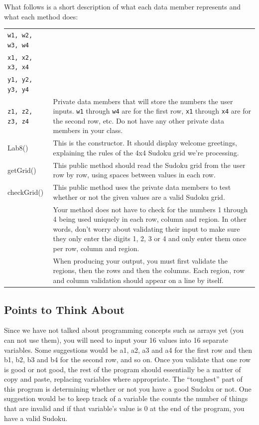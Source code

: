 \noindent What follows is a short description of what each data member represents and what each method does:\\
\begin{tabular}{|l|p{10cm}|}
\hline
{\tt w1, w2, w3, w4} &  \\
{\tt x1, x2, x3, x4} & \\
{\tt y1, y2, y3, y4} & \\
{\tt z1, z2, z3, z4}	&  Private data members that will store the numbers the user inputs.  {\tt w1} through {\tt w4} are for the first row, {\tt x1} through {\tt x4} are for the second row, etc.  Do not have any other private data members in your class.\\
\hline
Lab8()	&This is the constructor.  It should display welcome greetings, explaining the rules of the 4x4 Sudoku grid we're processing.\\
\hline
getGrid()	& This public method should read the Sudoku grid from the user row by row, using spaces between values in each row.\\
\hline 
checkGrid() &	This public method uses the private data members to test whether or not the given values are a valid Sudoku grid.\\
& Your method does not have to check for the numbers 1 through 4 being used uniquely in each row, column and region.  In other words, don't worry about validating their input to make sure they only enter the digits 1, 2, 3 or 4 and only enter them once per row, column and region. \\ 
& When producing your output, you must first validate the regions, then the rows and then the columns.  Each region, row and column validation should appear on a line by itself. \\
\hline
\end{tabular}

\vspace{-0.05in}
\subsection*{Points to Think About}
\vspace{-0.05in}
Since we have not talked about programming concepts such as arrays yet (you can not use them), you will need to input your 16 values into 16 separate variables.  Some suggestions would be a1, a2, a3 and a4 for the first row and then b1, b2, b3 and b4 for the second row, and so on.
Once you validate that one row is good or not good, the rest of the program should essentially be a matter of copy and paste, replacing variables where appropriate.
The ``toughest'' part of this program is determining whether or not you have a good Sudoku or not.  One suggestion would be to keep track of a variable the counts the number of things that are invalid and if that variable's value is 0 at the end of the program, you have a valid Sudoku.

